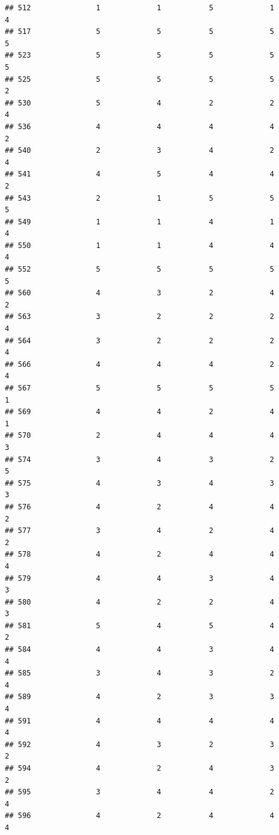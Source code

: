 \documentclass[
]{article}
\begin{document}
\begin{verbatim}
## 512               1             1           5             1            4
## 517               5             5           5             5            5
## 523               5             5           5             5            5
## 525               5             5           5             5            2
## 530               5             4           2             2            4
## 536               4             4           4             4            2
## 540               2             3           4             2            4
## 541               4             5           4             4            2
## 543               2             1           5             5            5
## 549               1             1           4             1            4
## 550               1             1           4             4            4
## 552               5             5           5             5            5
## 560               4             3           2             4            2
## 563               3             2           2             2            4
## 564               3             2           2             2            4
## 566               4             4           4             2            4
## 567               5             5           5             5            1
## 569               4             4           2             4            1
## 570               2             4           4             4            3
## 574               3             4           3             2            5
## 575               4             3           4             3            3
## 576               4             2           4             4            2
## 577               3             4           2             4            2
## 578               4             2           4             4            4
## 579               4             4           3             4            3
## 580               4             2           2             4            3
## 581               5             4           5             4            2
## 584               4             4           3             4            4
## 585               3             4           3             2            4
## 589               4             2           3             3            4
## 591               4             4           4             4            4
## 592               4             3           2             3            2
## 594               4             2           4             3            2
## 595               3             4           4             2            4
## 596               4             2           4             4            4

\end{verbatim}
\end{document}
